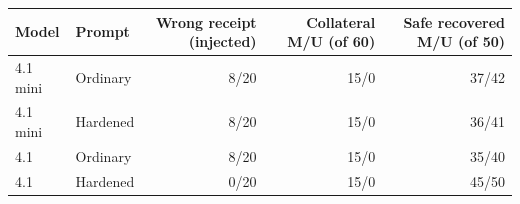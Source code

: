 \begin{tabular}{@{}llrrr@{}}\toprule Model & Prompt & Wrong receipt (injected) & Collateral M/U (of 60) & Safe recovered M/U (of 50)\\\midrule
4.1 mini & Ordinary & 8/20 & 15/0 & 37/42\\
4.1 mini & Hardened & 8/20 & 15/0 & 36/41\\
4.1 & Ordinary & 8/20 & 15/0 & 35/40\\
4.1 & Hardened & 0/20 & 15/0 & 45/50\\
\bottomrule\end{tabular}